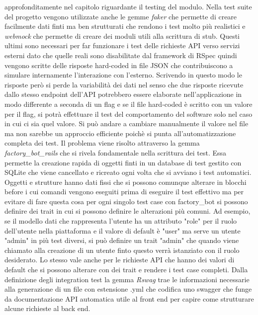 \documentclass[target=bach,aauheader=,style=]{thud}
\begin{document}
approfonditamente nel capitolo riguardante il testing del modulo. Nella test suite del progetto vengono utilizzate anche le gemme \textit{faker}\cite{faker_gem}
che permette di creare facilmente dati finti ma ben strutturati che rendono i test molto più realistici e \textit{webmock} che permette di creare dei moduli utili
alla scrittura di stub. Questi ultimi sono necessari per far funzionare i test delle richieste API verso servizi esterni dato che quelle reali sono disabilitate
dal framework di RSpec quindi vengono scritte delle risposte hard-coded in file JSON che contribuiscono a simulare internamente l'interazione con l'esterno.
Scrivendo in questo modo le risposte però si perde la variabilità dei dati nel senso che due risposte ricevute dallo stesso endpoint dell'API potrebbero essere
elaborate nell'applicazione in modo differente a seconda di un flag e se il file hard-coded è scritto con un valore per il flag, si potrà effettuare il test del
comportamento del software solo nel caso in cui ci sia quel valore. Si può andare a cambiare manualmente il valore nel file ma non sarebbe un approccio efficiente
poichè si punta all'automatizzazione completa dei test. Il problema viene risolto attraverso la gemma \textit{factory\_bot\_rails}\cite{factory_bot_rails_gem} che
si rivela fondamentale nella scrittura dei test. Essa permette la creazione rapida di oggetti finti in un database di test gestito con SQLite
che viene cancellato e ricreato ogni volta che si avviano i test automatici. Oggetti e strutture hanno dati fissi che si possono comunque alterare in blocchi
before i cui comandi vengono eseguiti prima di eseguire il test effettivo ma per evitare di fare questa cosa per ogni singolo test case con factory\_bot si possono
definire dei trait in cui si possono definire le alterazioni più comuni. Ad esempio, se il modello dati che rappresenta l'utente ha un attributo "role" per il ruolo
dell'utente nella piattaforma e il valore di default è "user" ma serve un utente "admin" in più test diversi, si può definire un trait "admin" che quando viene chiamato
alla creazione di un utente finto questo verrà istanziato con il ruolo desiderato. Lo stesso vale anche per le richieste API che hanno dei valori di default che si
possono alterare con dei trait e rendere i test case completi. Dalla definizione degli integration test la gemma \textit{Rswag}\cite{rswag_gem} trae le informazioni
necessarie alla generazione di un file con estensione .yml che codifica uno swagger che funge da documentazione API automatica utile al front end per capire come
strutturare alcune richieste al back end.
\end{document}
